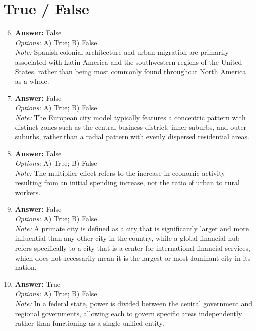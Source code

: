 \documentclass[12pt]{article}
\begin{document}
\section*{True / False}
\begin{enumerate}[label=\arabic*.]
\setcounter{enumi}{5}
\item \textbf{Answer:} False
\\ \textit{Options:} A) True; B) False
\\ \textit{Note:} Spanish colonial architecture and urban migration are primarily associated with Latin America and the southwestern regions of the United States, rather than being most commonly found throughout North America as a whole.
\item \textbf{Answer:} False
\\ \textit{Options:} A) True; B) False
\\ \textit{Note:} The European city model typically features a concentric pattern with distinct zones such as the central business district, inner suburbs, and outer suburbs, rather than a radial pattern with evenly dispersed residential areas.
\item \textbf{Answer:} False
\\ \textit{Options:} A) True; B) False
\\ \textit{Note:} The multiplier effect refers to the increase in economic activity resulting from an initial spending increase, not the ratio of urban to rural workers.
\item \textbf{Answer:} False
\\ \textit{Options:} A) True; B) False
\\ \textit{Note:} A primate city is defined as a city that is significantly larger and more influential than any other city in the country, while a global financial hub refers specifically to a city that is a center for international financial services, which does not necessarily mean it is the largest or most dominant city in its nation.
\item \textbf{Answer:} True
\\ \textit{Options:} A) True; B) False
\\ \textit{Note:} In a federal state, power is divided between the central government and regional governments, allowing each to govern specific areas independently rather than functioning as a single unified entity.
\end{enumerate}
\end{document}
